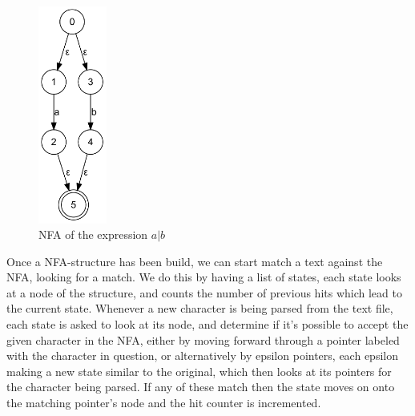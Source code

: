 \begin{figure}[h!]
  \centering
      \includegraphics[width=0.2\textwidth]{lib/A_OR_B.png}
  \caption{NFA of the expression $a | b$}
\label{fig:A_OR_B}
\end{figure}

Once a NFA-structure has been build, we can start match a text against the NFA, looking for a match. We do this by having a list of states, each state looks at a node of the structure, and counts the number of previous hits which lead to the current state. Whenever a new character is being parsed from the text file, each state is asked to look at its node, and determine if it's possible to accept the given character in the NFA, either by moving forward through a pointer labeled with the character in question, or alternatively by epsilon pointers, each epsilon making a new state similar to the original, which then looks at its pointers for the character being parsed. If any of these match then the state moves on onto the matching pointer's node and the hit counter is incremented. %

